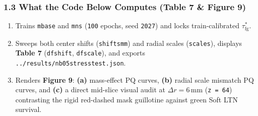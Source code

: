 \documentclass[10pt,a4paper]{article}
\renewcommand{\_}{\origunderscore\allowbreak}
\begin{document}
\subsubsection*{1.3 What the Code Below Computes (Table 7 \& Figure 9)}
\begin{enumerate}
\item Trains \texttt{m\_base} and \texttt{m\_ns} (\texttt{100} epochs, seed \texttt{2027}) and locks train-calibrated $\tau_{\text{fg}}^*$.
\item Sweeps both center shifts (\texttt{shifts\_mm}) and radial scales (\texttt{scales}), displays \textbf{Table 7} (\texttt{df\_shift}, \texttt{df\_scale}), and exports \texttt{../\allowbreak{}results/\allowbreak{}nb05\_stress\_test.json}.
\item Renders \textbf{Figure 9}: \textbf{(a)} mass-effect $\text{PQ}$ curves, \textbf{(b)} radial scale mismatch $\text{PQ}$ curves, and \textbf{(c)} a direct mid-slice visual audit at $\Delta r = 6\,\text{mm}$ (\texttt{z = 64}) contrasting the rigid red-dashed mask guillotine against green Soft LTN survival.
\end{enumerate}
\end{document}
